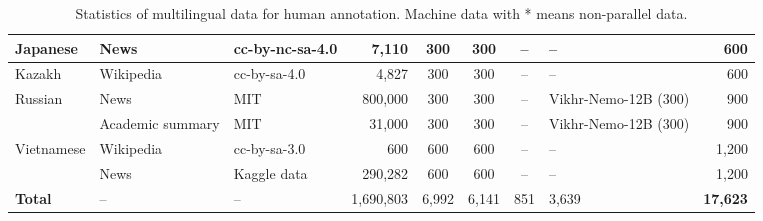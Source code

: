 \begin{table*}[ht!]
{\begin{tabular}{lllr|ccclr}
    \midrule
    Japanese & News & cc-by-nc-sa-4.0 & 7,110 & 300 & 300 & -- & -- & 600 \\
     \midrule
    Kazakh & Wikipedia & cc-by-sa-4.0 &  4,827 & 300 & 300  & -- & -- & 600\\
    \midrule
    \multirow{2}{*}{Russian} 
    & News & MIT & 800,000 & 300 & 300 & -- & Vikhr-Nemo-12B (300) & 900 \\
    & Academic summary & MIT & 31,000 & 300 & 300 & -- & Vikhr-Nemo-12B (300) & 900 \\
    \midrule
    \multirow{2}{*}{Vietnamese} 
    & Wikipedia & cc-by-sa-3.0 & 600 & 600 & 600 & -- & -- & 1,200 \\
    & News & Kaggle data & 290,282 & 600 & 600 & -- & -- & 1,200 \\
    \midrule
    \bf Total & -- & -- & 1,690,803	& 6,992 & 6,141 & 851 & 3,639 & \textbf{17,623} \\
    \bottomrule
    \end{tabular}
   }
    \caption{Statistics of multilingual data for human annotation. Machine data with * means non-parallel data. }
    \label{tab:multilingual-data}
\end{table*}



